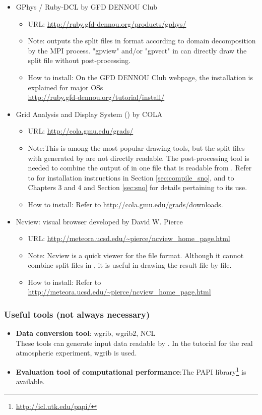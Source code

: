 \begin{itemize}
\item GPhys / Ruby-DCL by GFD DENNOU Club
 \begin{itemize}
  \item URL: \url{http://ruby.gfd-dennou.org/products/gphys/}
  \item Note: \scalelib outputs the split files
  in {\netcdf} format according to domain decomposition by the MPI process.
  "gpview" and/or "gpvect" in {\gphys} can directly draw the split file without post-processing.
  \item How to install:
  On the GFD DENNOU Club webpage, the installation is explained for major OSs\\
  \url{http://ruby.gfd-dennou.org/tutorial/install/}\\
   \end{itemize}
\item Grid Analysis and Display System (\grads) by COLA
 \begin{itemize}
  \item URL: \url{http://cola.gmu.edu/grads/}
  \item Note:This is among the most popular drawing tools,
  but the split files with {\netcdf} generated by \scalelib are not directly readable.
  The post-processing tool \sno is needed to combine the output of \scalelib in one file that is readable from \grads.
  Refer to \sno for installation instructions in Section \ref{sec:compile_sno},
  and to Chapters 3 and 4 and Section \ref{sec:sno} for details pertaining to its use.
  \item How to install: Refer to \url{http://cola.gmu.edu/grads/downloads}.
 \end{itemize}
\item Ncview: {\netcdf} visual browser developed by David W. Pierce
 \begin{itemize}
  \item URL: \url{http://meteora.ucsd.edu/~pierce/ncview_home_page.html}
  \item Note: Ncview is a quick viewer for the {\netcdf} file format.
  Although it cannot combine split files in \scalelib, it is useful in drawing the result file by file.
  \item How to install: Refer to \url{http://meteora.ucsd.edu/~pierce/ncview_home_page.html}
 \end{itemize}
\end{itemize}


\subsubsection{Useful tools (not always necessary)}
\begin{itemize}
  \item {\bf Data conversion tool}: wgrib, wgrib2, NCL\\
  These tools can generate input data readable by \scalerm.
  In the tutorial for the real atmospheric experiment, wgrib is used.
  \item {\bf Evaluation tool of computational performance}:The PAPI library\footnote{\url{http://icl.utk.edu/papi/}} is available.
\end{itemize}

